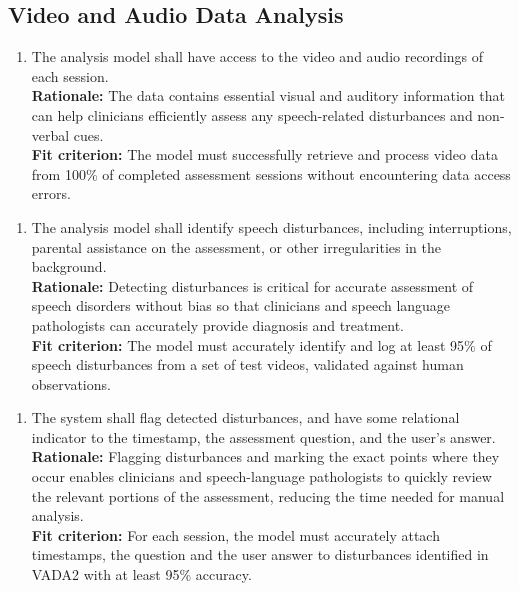 \documentclass[12pt]{article}
\begin{document}
\subsection{Video and Audio Data Analysis}
\begin{enumerate}[{FR-VADA}4. ]
  \item The analysis model shall have access to the video and audio recordings of each session.\\
  \textbf{Rationale: }The data contains essential visual and auditory information that can help clinicians 
  efficiently assess any speech-related disturbances and non-verbal cues.\\
  \textbf{Fit criterion: }The model must successfully retrieve and process video data from 100\% of 
  completed assessment sessions without encountering data access errors.
\end{enumerate}
\begin{enumerate}[{FR-VADA}2. ]
  \item The analysis model shall identify speech disturbances, including interruptions, parental 
  assistance on the assessment, or other irregularities in the background.\\
  \textbf{Rationale: }Detecting disturbances is critical for accurate assessment of speech disorders without 
  bias so that clinicians and speech language pathologists can accurately provide diagnosis and treatment.\\
  \textbf{Fit criterion: }The model must accurately identify and log at least 95\% of speech disturbances 
  from a set of test videos, validated against human observations.
\end{enumerate}
\begin{enumerate}[{FR-VADA}3. ]
  \item The system shall flag detected disturbances, and have some relational indicator to the timestamp, the assessment question, and the user's answer.\\
  \textbf{Rationale: }Flagging disturbances and marking the exact points where they occur enables clinicians and 
  speech-language pathologists to quickly review the relevant portions of the assessment, reducing the time needed 
  for manual analysis.\\
  \textbf{Fit criterion: }For each session, the model must accurately attach timestamps, the question and the user answer to disturbances
  identified in VADA2 with at least 95\% accuracy.
\end{enumerate}
\end{document}
